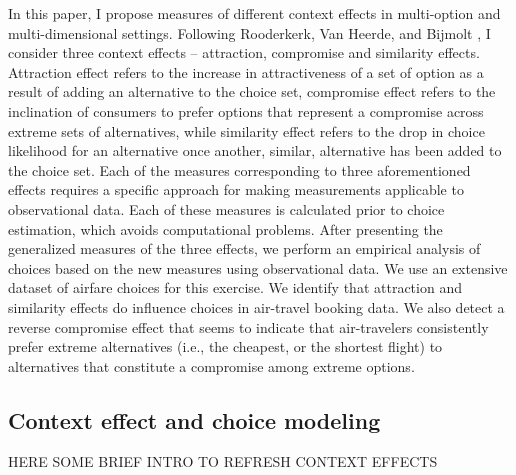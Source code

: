 \documentclass[a4paper,12pt]{article}
\newcommand{\citeyearonly}[1]{\citeyearpar{#1}}
\begin{document}
In this paper, I propose measures of different context effects in multi-option and multi-dimensional settings. Following Rooderkerk, Van Heerde, and Bijmolt \citeyearonly{roodrkerkEtAl11}, I consider three context effects – attraction, compromise and similarity effects. Attraction effect refers to the increase in attractiveness of a set of option as a result of adding an alternative to the choice set, compromise effect refers to the inclination of consumers to prefer options that represent a compromise across extreme sets of alternatives, while similarity effect refers to the drop in choice likelihood for an alternative once another, similar, alternative has been added to the choice set. Each of the measures corresponding to three aforementioned effects requires a specific approach for making measurements applicable to observational data. Each of these measures is calculated prior to choice estimation, which avoids computational problems. After presenting the generalized measures of the three effects, we perform an empirical analysis of choices based on the new measures using observational data. We use an extensive dataset of airfare choices for this exercise. We identify that attraction and similarity effects do influence choices in air-travel booking data. We also detect a reverse compromise effect that seems to indicate that air-travelers consistently prefer extreme alternatives (i.e., the cheapest, or the shortest flight) to alternatives that constitute a compromise among extreme options.

\subsection{Context effect and choice modeling}

HERE SOME BRIEF INTRO TO REFRESH CONTEXT EFFECTS
\end{document}
